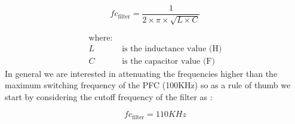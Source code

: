 \documentclass{article}
\begin{document}
\[
fc_{\text{filter}} =  \frac{1}{2\times\pi\times\sqrt{L\times C}}
\]

\begin{align*}
\text{where:} \\
 L &\text{ is the inductance value (H)} \\
 C &\text{ is the capacitor value (F}\text{)}
\end{align*}
In general we are interested in attenuating the frequencies higher than the maximum switching frequency of the PFC (100KHz) so as a rule of thumb we start by considering the cutoff frequency of the filter as :

\[
fc_{\text{filter}} =  110 KHz
\]

\end{document}
